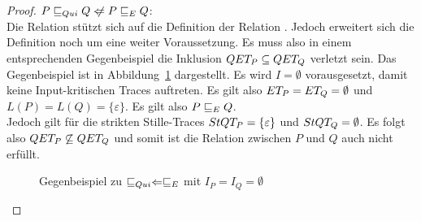 \begin{proof}
  $P \QRel Q \hspace{0.1cm}\not\hspace{-0.1cm}\Leftarrow P \ERel Q$:\\
  Die Relation \QRel{} stützt sich auf die Definition der Relation \ERel{}.
  Jedoch erweitert sich die Definition noch um eine weiter Voraussetzung. Es
  muss also in einem entsprechenden Gegenbeispiel die Inklusion $QET _P
  \subseteq QET _Q$ verletzt sein. Das Gegenbeispiel ist in
  Abbildung~\ref{QuiEGegenBsp} dargestellt. Es wird $I = \emptyset$
  vorausgesetzt, damit keine Input-kritischen Traces auftreten. Es gilt also
  $ET _P = ET _Q = \emptyset$ und $L(P) = L(Q) = \{\varepsilon\}$. Es gilt
  also $P \sqsubseteq  _E Q$.\\
  Jedoch gilt für die strikten Stille-Traces $StQT _P = \{\varepsilon\}$ und
  $StQT _Q = \emptyset$. Es folgt also $QET _P \not\subseteq QET _Q$ und
  somit ist die Relation \QRel{} zwischen $P$ und $Q$ auch nicht erfüllt.

  \begin{figure}[htbp]
    \begin{center}
      \caption{Gegenbeispiel zu $ \sqsubseteq  _{Qui} \Leftarrow  \sqsubseteq  _E$ mit $I_P = I_Q =
      \emptyset$}
      \label{QuiEGegenBsp}
    \end{center}
  \end{figure}
\end{proof}


